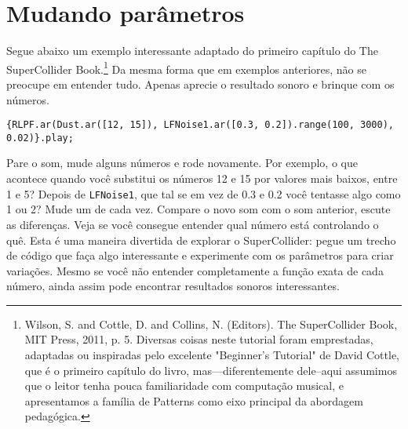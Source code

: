 \section{Mudando parâmetros}

Segue abaixo um exemplo interessante adaptado do primeiro capítulo do The SuperCollider Book.\footnote{
Wilson, S. and Cottle, D. and Collins, N. (Editors). The SuperCollider Book, MIT Press, 2011, p. 5. Diversas coisas neste tutorial foram emprestadas, adaptadas ou inspiradas pelo excelente "Beginner’s Tutorial" de David Cottle, que é o primeiro capítulo do livro, mas---diferentemente dele--aqui assumimos que o leitor tenha pouca familiaridade com computação musical, e apresentamos a família de Patterns como eixo principal da abordagem pedagógica.
} Da mesma forma que em exemplos anteriores, não se preocupe em entender tudo. Apenas aprecie o resultado sonoro e brinque com os números.


\begin{lstlisting}[style=SuperCollider-IDE, basicstyle=\scttfamily\footnotesize]
{RLPF.ar(Dust.ar([12, 15]), LFNoise1.ar([0.3, 0.2]).range(100, 3000), 0.02)}.play;
\end{lstlisting}

Pare o som, mude alguns números e rode novamente. Por exemplo, o que acontece quando você substitui os números 12 e 15 por valores mais baixos, entre 1 e 5? Depois de \texttt{LFNoise1}, que tal se em vez de 0.3 e 0.2 você tentasse algo como 1 ou 2? Mude um de cada vez. Compare o novo som com o som anterior, escute as diferenças. Veja se você consegue entender qual número está controlando o quê. Esta é uma maneira divertida de explorar o SuperCollider: pegue um trecho de código que faça algo interessante e experimente com os parâmetros para criar variações. Mesmo se você não entender completamente a função exata de cada número, ainda assim pode encontrar resultados sonoros interessantes.

\bigskip 
{}
